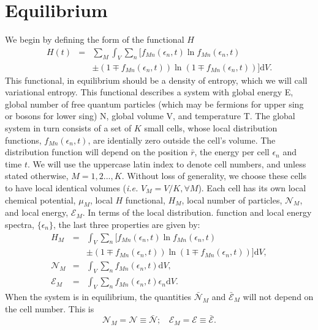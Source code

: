\documentclass{article}
\begin{document}
\section{Equilibrium}
We begin by defining the form of the functional $H$
\begin{eqnarray}
    H(t)&=&\sum_{M} \int_V \sum_{n} [ f_{Mn}(\epsilon_{n},t) \ln f_{Mn}(\epsilon_{n},t)\nonumber \\
    &&\pm (1 \mp f_{Mn}(\epsilon_{n},t)) \ln (1 \mp f_{Mn}(\epsilon_{n},t)) ]\mathrm{d}V \label{entropy}.
\end{eqnarray}
This functional, in equilibrium should be a density of entropy, which we will call variational entropy.
This functional describes a system with global energy E, global number of free
quantum particles (which may be fermions for upper sing or bosons for lower sing) N, global volume V, and temperature T. The
global system in turn consists of a set of $K$ small cells, whose local distribution functions, $f_{Mn}(\epsilon_{n},t)$, are
identially zero outside the cell’s volume. The distribution function will depend on the position $\bar{r}$, the energy per cell $\epsilon_{n}$ and time $t$. We will use the uppercase latin index to denote cell numbers, and unless stated otherwise, $M = 1, 2 . . . , K$. Without loss of generality, we choose these cells to have
local identical volumes (\textit{i.e.} $V_M = V/K, \forall M$). Each cell has its own local chemical potential, $\mu_M$, local
$H$ functional, $H_M$, local number of particles, $\mathcal{N}_M$, and local energy, $\mathcal{E}_M$. In terms of the local distribution.
function and local energy spectra, $\{\epsilon_{n}\}$, the last three properties are given by:
\begin{eqnarray}
    H_M&=& \int_V \sum_{n} [ f_{Mn}(\epsilon_{n},t) \ln f_{Mn}(\epsilon_{n},t)\nonumber \\
    &&\pm (1 \mp f_{Mn}(\epsilon_{n},t)) \ln (1 \mp f_{Mn}(\epsilon_{n},t)) ]\mathrm{d}V \label{entropycell},\\
    {\mathcal{N}}_M&=&\int_V \sum_{n}f_{Mn}(\epsilon_{n} ,t)\mathrm{d}V, \nonumber \\
{\mathcal{E}}_M&=&\int_V \sum_{n}f_{Mn}(\epsilon_{n},t)\epsilon_{n}\mathrm{d}V.
\end{eqnarray}
When the system is in equilibrium, the quantities $\bar{\mathcal{N}}_M$ and $\bar{\mathcal{E}}_M$ will not depend on the cell number. This is
\begin{equation}
   {\mathcal{N}}_M=\mathcal{N}\equiv \bar{\mathcal{N}}; \ \ \ \  {\mathcal{E}}_M=\mathcal{E}\equiv \bar{\mathcal{E}}.
\end{equation}
\end{document}
